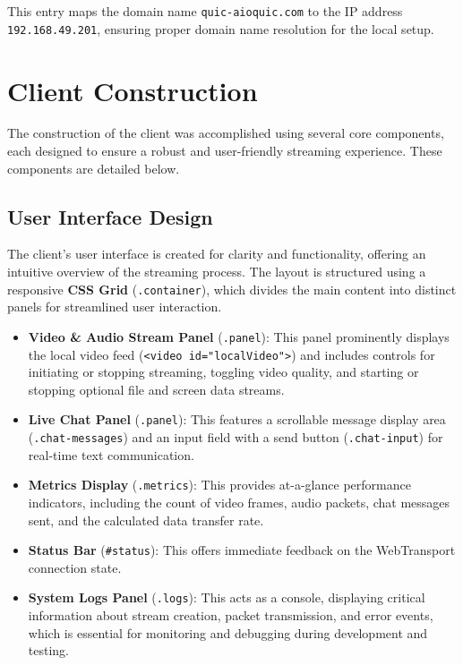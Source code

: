 This entry maps the domain name \texttt{quic-aioquic.com} to the IP address \texttt{192.168.49.201}, ensuring proper domain name resolution for the local setup.




\section{Client Construction}
The construction of the client was accomplished using several core components, each designed to ensure a robust and user-friendly streaming experience. These components are detailed below.

\subsection{User Interface Design}
The client's user interface is created for clarity and functionality, offering an intuitive overview of the streaming process. The layout is structured using a responsive \textbf{CSS Grid} (\texttt{.container}), which divides the main content into distinct panels for streamlined user interaction.

\begin{itemize}
    \item \textbf{Video \& Audio Stream Panel} (\texttt{.panel}): This panel prominently displays the local video feed (\texttt{<video id="localVideo">}) and includes controls for initiating or stopping streaming, toggling video quality, and starting or stopping optional file and screen data streams.
    \item \textbf{Live Chat Panel} (\texttt{.panel}): This features a scrollable message display area (\texttt{.chat-\allowbreak{}messages}) and an input field with a send button (\texttt{.chat-input}) for real-time text communication.
    \item \textbf{Metrics Display} (\texttt{.metrics}): This provides at-a-glance performance indicators, including the count of video frames, audio packets, chat messages sent, and the calculated data transfer rate.
    \item \textbf{Status Bar} (\texttt{\#status}): This offers immediate feedback on the WebTransport connection state.
    \item \textbf{System Logs Panel} (\texttt{.logs}): This acts as a console, displaying critical information about stream creation, packet transmission, and error events, which is essential for monitoring and debugging during development and testing.
\end{itemize}

